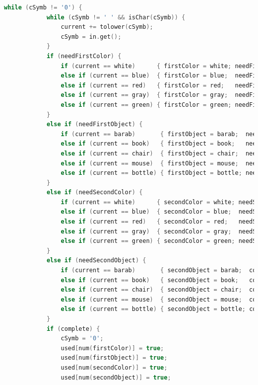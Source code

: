 \documentclass[a4paper,12pt]{article}
\begin{document}
\begin{lstlisting}[language=C++]
        while (cSymb != '0') {
            while (cSymb != ' ' && isChar(cSymb)) {
                current += tolower(cSymb);
                cSymb = in.get();
            }
            if (needFirstColor) {
                if (current == white)      { firstColor = white; needFirstObject = true; needFirstColor = false; }
                else if (current == blue)  { firstColor = blue;  needFirstObject = true; needFirstColor = false; }
                else if (current == red)   { firstColor = red;   needFirstObject = true; needFirstColor = false; }
                else if (current == gray)  { firstColor = gray;  needFirstObject = true; needFirstColor = false; }
                else if (current == green) { firstColor = green; needFirstObject = true; needFirstColor = false; }
            }
            else if (needFirstObject) {
                if (current == barab)       { firstObject = barab;  needSecondColor = true; needFirstObject = false; }
                else if (current == book)   { firstObject = book;   needSecondColor = true; needFirstObject = false; }
                else if (current == chair)  { firstObject = chair;  needSecondColor = true; needFirstObject = false; }
                else if (current == mouse)  { firstObject = mouse;  needSecondColor = true; needFirstObject = false; }
                else if (current == bottle) { firstObject = bottle; needSecondColor = true; needFirstObject = false; }
            }
            else if (needSecondColor) {
                if (current == white)      { secondColor = white; needSecondObject = true; needSecondColor = false; }
                else if (current == blue)  { secondColor = blue;  needSecondObject = true; needSecondColor = false; }
                else if (current == red)   { secondColor = red;   needSecondObject = true; needSecondColor = false; }
                else if (current == gray)  { secondColor = gray;  needSecondObject = true; needSecondColor = false; }
                else if (current == green) { secondColor = green; needSecondObject = true; needSecondColor = false; }
            }
            else if (needSecondObject) {
                if (current == barab)       { secondObject = barab;  complete = true; needSecondObject = false; }
                else if (current == book)   { secondObject = book;   complete = true; needSecondObject = false; }
                else if (current == chair)  { secondObject = chair;  complete = true; needSecondObject = false; }
                else if (current == mouse)  { secondObject = mouse;  complete = true; needSecondObject = false; }
                else if (current == bottle) { secondObject = bottle; complete = true; needSecondObject = false; }
            }
            if (complete) {
                cSymb = '0';
                used[num(firstColor)] = true;
                used[num(firstObject)] = true;
                used[num(secondColor)] = true;
                used[num(secondObject)] = true;
                

\end{lstlisting}
\end{document}
